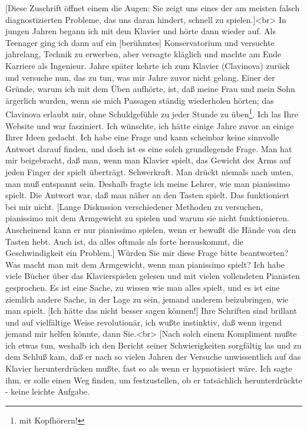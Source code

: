 \item \label{testimonials06}
[Diese Zuschrift öffnet einem die Augen: Sie zeigt uns eines der am meisten falsch diagnostizierten Probleme, das uns daran hindert, schnell zu spielen.]<br>
In jungen Jahren begann ich mit dem Klavier und hörte dann wieder auf.
Als Teenager ging ich dann auf ein [berühmtes] Konservatorium und versuchte jahrelang, Technik zu erwerben, aber versagte kläglich und machte am Ende Karriere als Ingenieur.
Jahre später kehrte ich zum Klavier (Clavinova) zurück und versuche nun, das zu tun, was mir Jahre zuvor nicht gelang.
Einer der Gründe, warum ich mit dem Üben aufhörte, ist, daß meine Frau und mein Sohn ärgerlich wurden, wenn sie mich Passagen ständig wiederholen hörten; das Clavinova erlaubt mir, ohne Schuldgefühle zu jeder Stunde zu üben\footnote{mit Kopfhörern!}.
Ich las Ihre Website und war fasziniert.
Ich wünschte, ich hätte einige Jahre zuvor an einige Ihrer Ideen gedacht.
Ich habe eine Frage und kann scheinbar keine sinnvolle Antwort darauf finden, und doch ist es eine solch grundlegende Frage.
Man hat mir beigebracht, daß man, wenn man Klavier spielt, das Gewicht des Arms auf jeden Finger der spielt überträgt.
Schwerkraft.
Man drückt niemals nach unten, man muß entspannt sein.
Deshalb fragte ich meine Lehrer, wie man pianissimo spielt.
Die Antwort war, daß man näher an den Tasten spielt.
Das funktioniert bei mir nicht.
[Lange Diskussion verschiedener Methoden zu versuchen, pianissimo mit dem Armgewicht zu spielen und warum sie nicht funktionieren.
Anscheinend kann er nur pianissimo spielen, wenn er bewußt die Hände von den Tasten hebt.
Auch ist, da alles oftmals als forte herauskommt, die Geschwindigkeit ein Problem.]
Würden Sie mir diese Frage bitte beantworten?
Was macht man mit dem Armgewicht, wenn man pianissimo spielt?
Ich habe viele Bücher über das Klavierspielen gelesen und mit vielen vollendeten Pianisten gesprochen.
Es ist eine Sache, zu wissen wie man alles spielt, und es ist eine ziemlich andere Sache, in der Lage zu sein, jemand anderem beizubringen, wie man spielt.
[Ich hätte das nicht besser sagen können!]
Ihre Schriften sind brillant und auf vielfältige Weise revolutionär, ich wußte instinktiv, daß wenn irgend jemand mir helfen könnte, dann Sie.<br>
[Nach solch einem Kompliment mußte ich etwas tun, weshalb ich den Bericht seiner Schwierigkeiten sorgfältig las und zu dem Schluß kam, daß er nach so vielen Jahren der Versuche unwissentlich auf das Klavier herunterdrücken mußte, fast so als wenn er hypnotisiert wäre.
Ich sagte ihm, er solle einen Weg finden, um festzustellen, ob er tatsächlich herunterdrückte - keine leichte Aufgabe.
